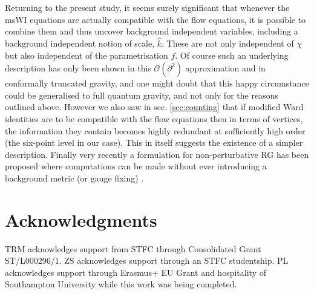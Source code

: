 \documentclass[11pt,a4paper]{article}
\numberwithin{figure}{section}
\numberwithin{equation}{section}
\newcommand{\hk}{\hat k} %
\begin{document}
Returning to the present study, it seems surely significant that  
whenever the msWI equations  are actually compatible with the flow equations, it is possible to combine them and thus uncover background independent variables, including a background independent notion of scale, $\hk$. These are not only independent of $\chi$ but also independent of the parametrisation $f$. Of course such an underlying description has only been shown in this $\mathcal{O}(\partial^2)$ approximation and in conformally truncated gravity, and one might doubt that this happy circumstance could be generalised to full quantum gravity, and not only for the reasons outlined above. However we also saw in sec. \ref{sec:counting} that if modified Ward identities are to be compatible with the flow equations then in terms of vertices, the information they contain becomes highly redundant at sufficiently high order (the six-point level in our case). This in itself suggests the existence of a simpler description. Finally very recently a formulation for non-perturbative RG has been proposed where computations can be made without ever introducing a background metric (or gauge fixing) \cite{Morris:2016nda}.



\section*{Acknowledgments}
TRM acknowledges support from STFC through Consolidated Grant ST/L000296/1. ZS acknowledges support through an STFC studentship. 
PL acknowledges support through Erasmus+ EU Grant and hospitality of Southampton University while this work was being completed.








\end{document}
